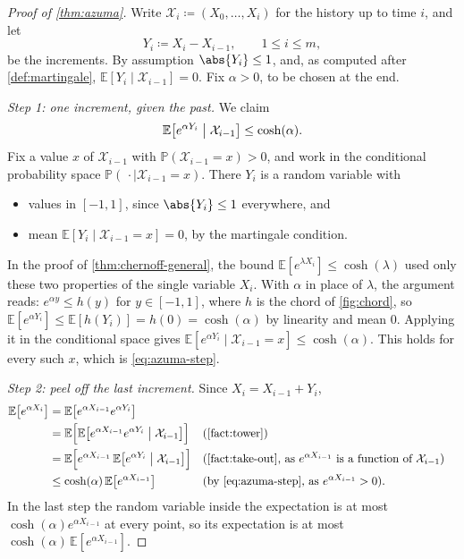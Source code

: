 \begin{proof}[Proof of \autoref{thm:azuma}]
    Write \(\mathcal{X}_{i} \coloneqq (X_{0}, \ldots, X_{i})\) for the history up to time \(i\), and let
    \[
        Y_{i} \coloneqq X_{i} - X_{i-1}, \qquad 1 \le i \le m ,
    \]
    be the increments. By assumption \(\abs{Y_{i}} \le 1\), and, as computed after \autoref{def:martingale}, \(\mathbb{E}[Y_{i} \mid \mathcal{X}_{i-1}] = 0\). Fix \(\alpha > 0\), to be chosen at the end.

    \emph{Step 1: one increment, given the past.} We claim
    \begin{equation}\label{eq:azuma-step}
        \mathbb{E}\bigl[ e^{\alpha Y_{i}} \bigm| \mathcal{X}_{i-1} \bigr] \le \cosh(\alpha) .
    \end{equation}
    Fix a value \(x\) of \(\mathcal{X}_{i-1}\) with \(\mathbb{P}(\mathcal{X}_{i-1} = x) > 0\), and work in the conditional probability space \(\mathbb{P}(\,\cdot \mid \mathcal{X}_{i-1} = x)\). There \(Y_{i}\) is a random variable with
    \begin{itemize}
        \item values in \([-1, 1]\), since \(\abs{Y_{i}} \le 1\) everywhere, and
        \item mean \(\mathbb{E}[Y_{i} \mid \mathcal{X}_{i-1} = x] = 0\), by the martingale condition.
    \end{itemize}
    In the proof of \autoref{thm:chernoff-general}, the bound \(\mathbb{E}[e^{\lambda X_{i}}] \le \cosh(\lambda)\) used only these two properties of the single variable \(X_{i}\). With \(\alpha\) in place of \(\lambda\), the argument reads: \(e^{\alpha y} \le h(y)\) for \(y \in [-1, 1]\), where \(h\) is the chord of \autoref{fig:chord}, so \(\mathbb{E}[e^{\alpha Y_{i}}] \le \mathbb{E}[h(Y_{i})] = h(0) = \cosh(\alpha)\) by linearity and mean \(0\). Applying it in the conditional space gives \(\mathbb{E}[e^{\alpha Y_{i}} \mid \mathcal{X}_{i-1} = x] \le \cosh(\alpha)\). This holds for every such \(x\), which is \eqref{eq:azuma-step}.

    \emph{Step 2: peel off the last increment.} Since \(X_{i} = X_{i-1} + Y_{i}\),
    \begin{align*}
        \mathbb{E}\bigl[ e^{\alpha X_{i}} \bigr]
        &= \mathbb{E}\bigl[ e^{\alpha X_{i-1}} e^{\alpha Y_{i}} \bigr] \\
        &= \mathbb{E}\Bigl[ \mathbb{E}\bigl[ e^{\alpha X_{i-1}} e^{\alpha Y_{i}} \bigm| \mathcal{X}_{i-1} \bigr] \Bigr]
            && \text{(\autoref{fact:tower})} \\
        &= \mathbb{E}\Bigl[ e^{\alpha X_{i-1}} \, \mathbb{E}\bigl[ e^{\alpha Y_{i}} \bigm| \mathcal{X}_{i-1} \bigr] \Bigr]
            && \text{(\autoref{fact:take-out}, as \(e^{\alpha X_{i-1}}\) is a function of \(\mathcal{X}_{i-1}\))} \\
        &\le \cosh(\alpha) \, \mathbb{E}\bigl[ e^{\alpha X_{i-1}} \bigr]
            && \text{(by \eqref{eq:azuma-step}, as \(e^{\alpha X_{i-1}} > 0\))} .
    \end{align*}
    In the last step the random variable inside the expectation is at most \(\cosh(\alpha) e^{\alpha X_{i-1}}\) at every point, so its expectation is at most \(\cosh(\alpha) \, \mathbb{E}[e^{\alpha X_{i-1}}]\).


\end{proof}
